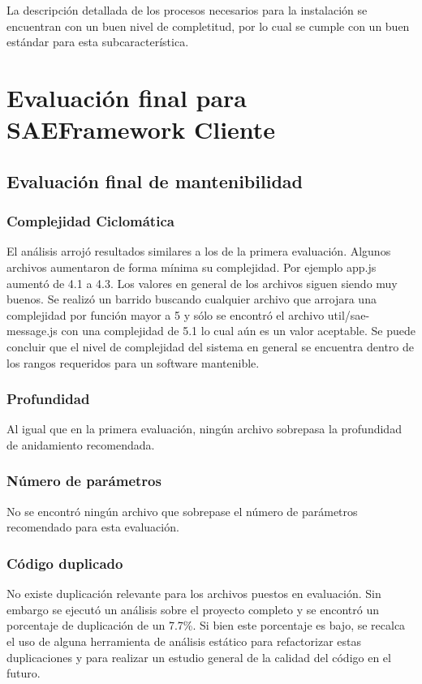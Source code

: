 La descripción detallada de los procesos necesarios para la instalación
se encuentran con un buen nivel de completitud, por lo cual se cumple con un
buen estándar para esta subcaracterística.

\section{Evaluación final para SAEFramework Cliente}
\subsection{Evaluación final de mantenibilidad}
\subsubsection{Complejidad Ciclomática}
El análisis arrojó resultados similares a los de la primera evaluación. Algunos archivos aumentaron
de forma mínima su complejidad. Por ejemplo app.js aumentó de 4.1 a 4.3.
Los valores en general de los archivos siguen siendo muy buenos.
Se realizó un barrido buscando cualquier archivo que arrojara una complejidad por función mayor
a 5 y sólo se encontró el archivo util/sae-message.js con una complejidad de 5.1 lo cual aún es
un valor aceptable.
Se puede concluir que el nivel de complejidad del sistema en general se encuentra dentro
de los rangos requeridos para un software mantenible.
\subsubsection{Profundidad}
Al igual que en la primera evaluación, ningún archivo sobrepasa la profundidad de anidamiento
recomendada.
\subsubsection{Número de parámetros}
No se encontró ningún archivo que sobrepase el número de parámetros recomendado para
esta evaluación.
\subsubsection{Código duplicado}
No existe duplicación relevante para los archivos puestos en evaluación. Sin embargo se ejecutó
un análisis sobre el proyecto completo y se encontró un porcentaje de duplicación de un 7.7\%.
Si bien este porcentaje es bajo, se recalca el uso de alguna herramienta de análisis estático para
refactorizar estas duplicaciones y para realizar un estudio general de la calidad del código en el futuro.

